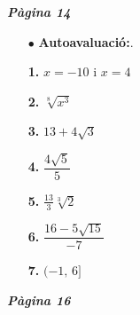 \documentclass[a4paper, pdf, twoside]{book}
\begin{document}
\begin{multicols}{2}

{\textbf{\em Pàgina 14}} \hrulefill
\begin{enumerate}
\vspace{0.25cm}
 \item[$\bullet$ ] {\selectfont\color{blue}\textbf{Autoavaluació:}. }

 \end{enumerate}
\begin{enumerate}
\vspace{0.25cm}
\item[\fontfamily{phv}\selectfont\color{blue}\textbf{1. }]  \scalebox{0.6}{\simbolclau } 
$x=-10$ i $x=4$
\vspace{0.25cm}
\item[\fontfamily{phv}\selectfont\color{blue}\textbf{2. }]  \scalebox{0.6}{\simbolclau } 
$\sqrt [8]{x^3}$
\vspace{0.25cm}
\item[\fontfamily{phv}\selectfont\color{blue}\textbf{3. }]  \scalebox{0.6}{\simbolclau } 
$13+4\sqrt {3}$
\vspace{0.25cm}
\item[\fontfamily{phv}\selectfont\color{blue}\textbf{4. }]  \scalebox{0.6}{\simbolclau } 
$\dfrac {4\sqrt {5}}{5}$
\vspace{0.25cm}
\item[\fontfamily{phv}\selectfont\color{blue}\textbf{5. }]  \scalebox{0.6}{\simbolclau } 
$\frac {13}{3}\sqrt [3]{2}$
\vspace{0.25cm}
\item[\fontfamily{phv}\selectfont\color{blue}\textbf{6. }]  \scalebox{0.6}{\simbolclau } 
$\dfrac {16-5\sqrt {15}}{-7}$
\vspace{0.25cm}
\item[\fontfamily{phv}\selectfont\color{blue}\textbf{7. }]  \scalebox{0.6}{\simbolclau } 
$(-1,\,6]$
 \end{enumerate}
\vfill\null
\columnbreak
\def\currentname{Solucions del Tema 2}
\vspace*{0.75cm}

 

\vspace*{0.4cm}
 {}
\vspace{0.3cm}


{\textbf{\em Pàgina 16}} \hrulefill
\begin{enumerate}
\vspace{0.25cm}



\end{enumerate}
\end{multicols}
\end{document}
